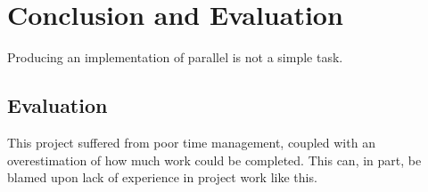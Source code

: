\documentclass[../main.tex]{subfiles}
\begin{document}
  \section{Conclusion and Evaluation}
    Producing an implementation of parallel is not a simple task.

    \subsection{Evaluation}
      This project suffered from poor time management, coupled with an overestimation of how much work could be completed.
      This can, in part, be blamed upon lack of experience in project work like this.
  
    \biblio
\end{document}
